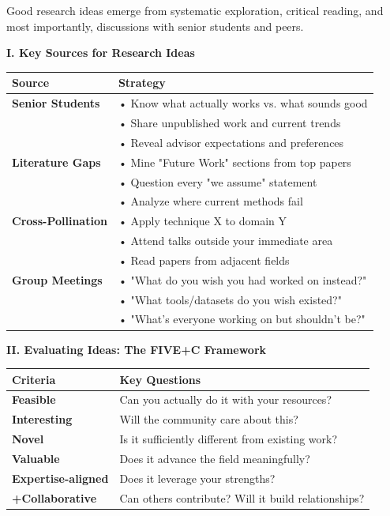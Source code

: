 \documentclass[11pt,a4paper]{article}
\begin{document}
\begin{tcolorbox}[colback=green!5,colframe=green!50,title=Ideas Come From Connections]
Good research ideas emerge from systematic exploration, critical reading, and most importantly, discussions with senior students and peers.
\end{tcolorbox}

\textbf{I. Key Sources for Research Ideas}

\begin{table}[H]
\centering
\small
\begin{tabular}{@{}p{3.5cm}p{9cm}@{}}
\toprule
\textbf{Source} & \textbf{Strategy} \\
\midrule
\textbf{Senior Students} & • Know what actually works vs. what sounds good\\
& • Share unpublished work and current trends\\
& • Reveal advisor expectations and preferences\\
\midrule
\textbf{Literature Gaps} & • Mine "Future Work" sections from top papers\\
& • Question every "we assume" statement\\
& • Analyze where current methods fail\\
\midrule
\textbf{Cross-Pollination} & • Apply technique X to domain Y\\
& • Attend talks outside your immediate area\\
& • Read papers from adjacent fields\\
\midrule
\textbf{Group Meetings} & • "What do you wish you had worked on instead?"\\
& • "What tools/datasets do you wish existed?"\\
& • "What's everyone working on but shouldn't be?"\\
\bottomrule
\end{tabular}
\end{table}

\textbf{II. Evaluating Ideas: The FIVE+C Framework}

\begin{table}[H]
\centering
\small
\begin{tabular}{@{}p{3cm}p{9.5cm}@{}}
\toprule
\textbf{Criteria} & \textbf{Key Questions} \\
\midrule
\textbf{Feasible} & Can you actually do it with your resources? \\
\textbf{Interesting} & Will the community care about this? \\
\textbf{Novel} & Is it sufficiently different from existing work? \\
\textbf{Valuable} & Does it advance the field meaningfully? \\
\textbf{Expertise-aligned} & Does it leverage your strengths? \\
\textbf{+Collaborative} & Can others contribute? Will it build relationships? \\
\bottomrule
\end{tabular}
\end{table}
\end{document}
